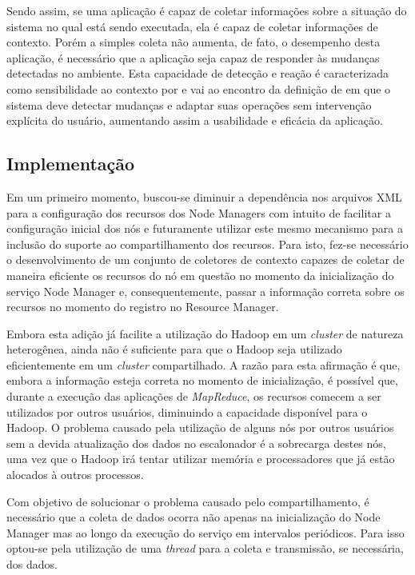 Sendo assim, se uma aplicação é capaz de coletar informações sobre a situação do sistema no qual está sendo executada, ela é capaz de coletar informações de contexto. Porém a simples coleta não aumenta, de fato, o desempenho desta aplicação, é necessário que a aplicação seja capaz de responder às mudanças detectadas no ambiente. Esta capacidade de detecção e reação é caracterizada como sensibilidade ao contexto por \cite{Maamar} e vai ao encontro da definição de \cite{Baldauf} em que o sistema deve detectar mudanças e adaptar suas operações sem intervenção explícita do usuário, aumentando assim a usabilidade e eficácia da aplicação.

\subsection{Implementação}
Em um primeiro momento, buscou-se diminuir a dependência nos arquivos XML para a configuração dos recursos dos Node Managers com intuito de facilitar a configuração inicial dos nós e futuramente utilizar este mesmo mecanismo para a inclusão do suporte ao compartilhamento dos recursos. Para isto, fez-se necessário o desenvolvimento de um conjunto de coletores de contexto capazes de coletar de maneira eficiente os recursos do nó em questão no momento da inicialização do serviço Node Manager e, consequentemente, passar a informação correta sobre os recursos no momento do registro no Resource Manager.

Embora esta adição já facilite a utilização do Hadoop em um \textit{cluster} de natureza heterogênea, ainda não é suficiente para que o Hadoop seja utilizado eficientemente em um \textit{cluster} compartilhado. A razão para esta afirmação é que, embora a informação esteja correta no momento de inicialização, é possível que, durante a execução das aplicações de \textit{MapReduce}, os recursos comecem a ser utilizados por outros usuários, diminuindo a capacidade disponível para o Hadoop. O problema causado pela utilização de alguns nós por outros usuários sem a devida atualização dos dados no escalonador é a sobrecarga destes nós, uma vez que o Hadoop irá tentar utilizar memória e processadores que já estão alocados à outros processos.

Com objetivo de solucionar o problema causado pelo compartilhamento, é necessário que a coleta de dados ocorra não apenas na inicialização do Node Manager mas ao longo da execução do serviço em intervalos periódicos. Para isso optou-se pela utilização de uma \textit{thread} para a coleta e transmissão, se necessária, dos dados.


